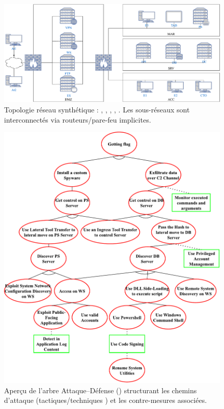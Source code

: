 \begin{figure}[h!]
  \centering
  \includegraphics[width=\linewidth]{figures/topology.pdf}
  \caption{Topologie réseau synthétique : , , , , . Les sous-réseaux sont interconnectés via routeurs/pare-feu implicites.}
  \label{fig:scenario_network_topology}
\end{figure}

\begin{figure}[h!]
  \centering
  \includegraphics[width=0.86\linewidth]{figures/ADTree.pdf}
  \caption{Aperçu de l’arbre Attaque–Défense () structurant les chemins d’attaque (tactiques/techniques ) et les contre-mesures associées.}
  \label{fig:ADTree}
\end{figure}


